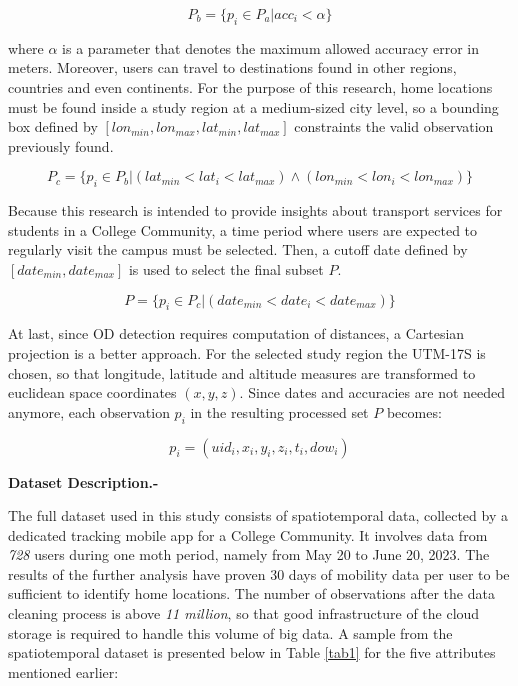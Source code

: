 \documentclass[runningheads]{llncs}
\begin{document}
\begin{equation}
  P_b  =  \{p_i\in P_a | acc_i< \alpha \}
\end{equation}

where \(\alpha\) is a parameter that denotes the maximum allowed accuracy error in meters. Moreover, users can travel to destinations found in other regions, countries and even continents. For the purpose of this research, home locations must be found inside a study region at a medium-sized city level, so a bounding box defined by \([lon_{min}, lon_{max}, lat_{min}, lat_{max}]\) constraints the valid observation previously found.

\begin{equation}
  P_c  =  \{p_i\in P_b | (lat_{min}<lat_i<lat_{max}) \wedge   (lon_{min}<lon_i<lon_{max}) \}
\end{equation}

Because this research is intended to provide insights about transport services for students in a College Community, a time period where users are expected to regularly visit the campus must be selected. Then, a cutoff date defined by \([date_{min}, date_{max}]\) is used to select the final subset \(P\).

\begin{equation}
  P  =  \{p_i\in P_c | (date_{min}<date_i<date_{max}) \}
\end{equation}

At last, since OD detection requires computation of distances, a Cartesian projection is a better approach. For the selected study region the UTM-17S is chosen, so that longitude, latitude and altitude measures are transformed to euclidean space coordinates \((x,y,z)\). Since dates and accuracies are not needed anymore, each observation \(p_i\) in the resulting processed set \(P\) becomes:

\[ p_i  = (uid_i, x_i, y_i, z_i, t_i, dow_i) \]

\textbf{Dataset Description.-}

The full dataset used in this study consists of spatiotemporal data, collected by a dedicated tracking mobile app for a College Community. It involves data from \emph{728} users during one moth period, namely from May 20 to June 20, 2023. The results of the further analysis have proven 30 days of mobility data per user to be sufficient to identify home locations. The number of observations after the data cleaning process is above \emph{11 million}, so that good infrastructure of the cloud storage is required to handle this volume of big data. A sample from the spatiotemporal dataset is presented below in Table \ref{tab1} for the five attributes mentioned earlier:
\end{document}
